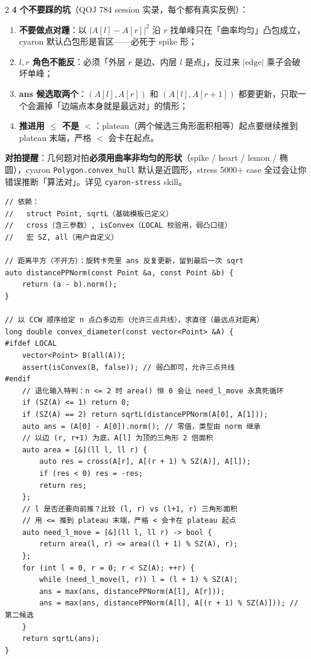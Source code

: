 \begin{multicols*}{2}
		\textbf{4 个不要踩的坑}（QOJ 784 session 实录，每个都有真实反例）：
		\begin{enumerate}
					\setlength\itemsep{0pt}
				\item \textbf{不要做点对踵}：以 $|A[l] - A[r]|^2$ 沿 $r$ 找单峰只在「曲率均匀」凸包成立，cyaron 默认凸包形是盲区——必死于 spike 形；
				\item \textbf{$l, r$ 角色不能反}：必须「外层 $r$ 是边、内层 $l$ 是点」，反过来 $|\text{edge}|$ 乘子会破坏单峰；
				\item \textbf{ans 候选取两个}：$(A[l], A[r])$ 和 $(A[l], A[r{+}1])$ 都要更新，只取一个会漏掉「边端点本身就是最远对」的情形；
				\item \textbf{推进用 $\le$ 不是 $<$}：plateau（两个候选三角形面积相等）起点要继续推到 plateau 末端，严格 $<$ 会卡在起点。
		\end{enumerate}

		\textbf{对拍提醒}：几何题对拍\textbf{必须用曲率非均匀的形状}（spike / heart / lemon / 椭圆），cyaron \texttt{Polygon.convex\_hull} 默认是近圆形，stress 5000+ case 全过会让你错误推断「算法对」。详见 \texttt{cyaron-stress} skill。

		\begin{verbatim}
// 依赖：
//   struct Point, sqrtL（基础模板已定义）
//   cross（含三参数）, isConvex（LOCAL 校验用，弱凸口径）
//   宏 SZ, all（用户自定义）

// 距离平方（不开方）：旋转卡壳里 ans 反复更新，留到最后一次 sqrt
auto distancePPNorm(const Point &a, const Point &b) {
	return (a - b).norm();
}

// 以 CCW 顺序给定 n 点凸多边形（允许三点共线），求直径（最远点对距离）
long double convex_diameter(const vector<Point> &A) {
#ifdef LOCAL
	vector<Point> B(all(A));
	assert(isConvex(B, false)); // 弱凸即可，允许三点共线
#endif
	// 退化输入特判：n <= 2 时 area() 恒 0 会让 need_l_move 永真死循环
	if (SZ(A) <= 1) return 0;
	if (SZ(A) == 2) return sqrtL(distancePPNorm(A[0], A[1]));
	auto ans = (A[0] - A[0]).norm(); // 零值，类型由 norm 继承
	// 以边 (r, r+1) 为底，A[l] 为顶的三角形 2 倍面积
	auto area = [&](ll l, ll r) {
		auto res = cross(A[r], A[(r + 1) % SZ(A)], A[l]);
		if (res < 0) res = -res;
		return res;
	};
	// l 是否还要向前推？比较 (l, r) vs (l+1, r) 三角形面积
	// 用 <= 推到 plateau 末端，严格 < 会卡在 plateau 起点
	auto need_l_move = [&](ll l, ll r) -> bool {
		return area(l, r) <= area((l + 1) % SZ(A), r);
	};
	for (int l = 0, r = 0; r < SZ(A); ++r) {
		while (need_l_move(l, r)) l = (l + 1) % SZ(A);
		ans = max(ans, distancePPNorm(A[l], A[r]));
		ans = max(ans, distancePPNorm(A[l], A[(r + 1) % SZ(A)])); // 第二候选
	}
	return sqrtL(ans);
}
		\end{verbatim}


\end{multicols*}
